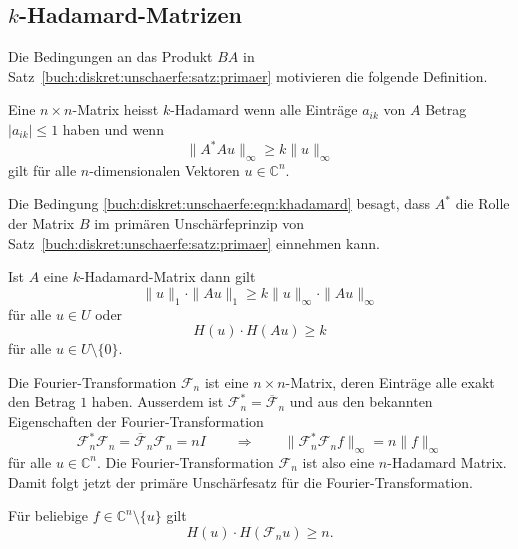 %
%
\subsection{$k$-Hadamard-Matrizen}
Die Bedingungen an das Produkt $BA$ in
Satz~\ref{buch:diskret:unschaerfe:satz:primaer}
motivieren die folgende Definition.

\begin{definition}
\label{buch:diskret:unschaerfe:def:khadamard}
Eine $n\times n$-Matrix heisst $k$-Hadamard wenn alle Einträge $a_{ik}$ von
%
$A$ Betrag $|a_{ik}|\le 1$ haben und wenn
\begin{equation}
\|A^*Au\|_\infty \ge k\|u\|_\infty
\label{buch:diskret:unschaerfe:eqn:khadamard}
\end{equation}
gilt für alle $n$-dimensionalen Vektoren $u\in \mathbb{C}^n$.
\end{definition}

Die Bedingung 
\eqref{buch:diskret:unschaerfe:eqn:khadamard}
besagt, dass $A^*$ die Rolle der Matrix $B$ im primären
Unschärfeprinzip von Satz~\ref{buch:diskret:unschaerfe:satz:primaer}
einnehmen kann.

\begin{satz}
Ist $A$ eine $k$-Hadamard-Matrix dann gilt
\[
\|u\|_1\cdot \|Au\|_1 \ge k\|u\|_\infty \cdot \|Au\|_\infty
\]
für alle $u\in U$ oder
\[
H(u)\cdot H(Au)\ge k
\]
für alle $u \in U\setminus\{0\}$.
\end{satz}

Die Fourier-Transformation $\mathscr{F}_n$ ist eine $n\times n$-Matrix,
deren Einträge alle exakt den Betrag $1$ haben.
Ausserdem ist $\mathscr{F}_n^* = \overline{\mathscr{F}}_n$ und aus den 
bekannten Eigenschaften der Fourier-Transformation
\[
\mathscr{F}_n^*\mathscr{F}_n
=
\overline{\mathscr{F}}_n\mathscr{F}_n
=
nI
\qquad\Rightarrow\qquad
\| \mathscr{F}_n^*\mathscr{F}_n f\|_\infty
=
n \|f\|_\infty
\]
für alle $u\in\mathbb{C}^n$.
Die Fourier-Transformation $\mathscr{F}_n$ ist also eine
$n$-Hadamard Matrix.
Damit folgt jetzt der primäre Unschärfesatz für die Fourier-Transformation.

\begin{satz}
Für beliebige $f\in \mathbb{C}^n\setminus\{u\}$ gilt
\begin{equation}
H(u)\cdot H(\mathscr{F}_nu) \ge n.
\end{equation}
\end{satz}

